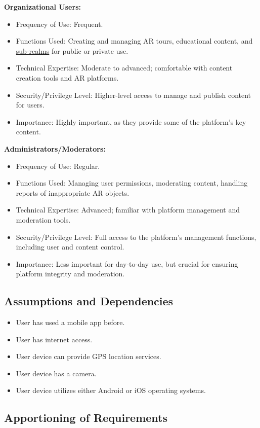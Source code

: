 \documentclass{article}
\begin{document}
\textbf{Organizational Users:}
\begin{itemize}
    \item Frequency of Use: Frequent.
    \item Functions Used: Creating and managing AR tours, educational content, and \hyperref[def:sub_realm]{sub-realms} for public or private use.
    \item Technical Expertise: Moderate to advanced; comfortable with content creation tools and AR platforms.
    \item Security/Privilege Level: Higher-level access to manage and publish content for users.
    \item Importance: Highly important, as they provide some of the platform’s key content.
\end{itemize}

\textbf{Administrators/Moderators:}
\begin{itemize}
    \item Frequency of Use: Regular.
    \item Functions Used: Managing user permissions, moderating content, handling reports of inappropriate AR objects.
    \item Technical Expertise: Advanced; familiar with platform management and moderation tools.
    \item Security/Privilege Level: Full access to the platform's management functions, including user and content control.
    \item Importance: Less important for day-to-day use, but crucial for ensuring platform integrity and moderation.
\end{itemize}

\subsection{Assumptions and Dependencies}

\begin{itemize}
    \item User has used a mobile app before.
    \item User has internet access.
    \item User device can provide GPS location services.
    \item User device has a camera.
    \item User device utilizes either Android or iOS operating systems.
\end{itemize}

\subsection{Apportioning of Requirements}
\end{document}
